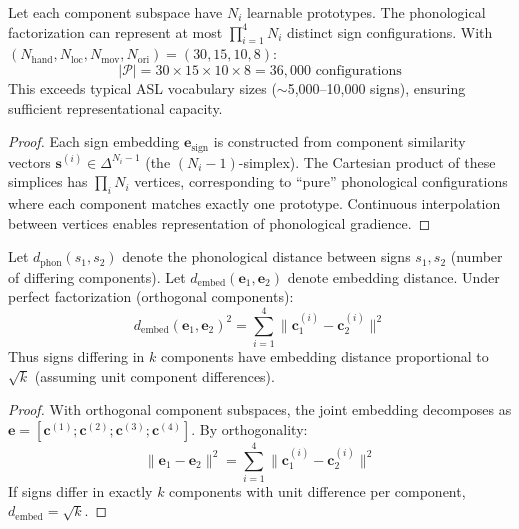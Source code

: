 \documentclass{article}
\begin{document}
\begin{proposition}
\label{prop:capacity}
Let each component subspace have $N_i$ learnable prototypes. The phonological factorization can represent at most $\prod_{i=1}^{4} N_i$ distinct sign configurations. With $(N_{\text{hand}}, N_{\text{loc}}, N_{\text{mov}}, N_{\text{ori}}) = (30, 15, 10, 8)$:
\begin{equation}
|\mathcal{P}| = 30 \times 15 \times 10 \times 8 = 36,000 \text{ configurations}
\end{equation}
This exceeds typical ASL vocabulary sizes ($\sim$5,000--10,000 signs), ensuring sufficient representational capacity.
\end{proposition}

\begin{proof}
Each sign embedding $\mathbf{e}_{\text{sign}}$ is constructed from component similarity vectors $\mathbf{s}^{(i)} \in \Delta^{N_i-1}$ (the $(N_i-1)$-simplex). The Cartesian product of these simplices has $\prod_i N_i$ vertices, corresponding to ``pure'' phonological configurations where each component matches exactly one prototype. Continuous interpolation between vertices enables representation of phonological gradience.
\end{proof}

\begin{theorem}
\label{thm:distance}
Let $d_{\text{phon}}(s_1, s_2)$ denote the phonological distance between signs $s_1, s_2$ (number of differing components). Let $d_{\text{embed}}(\mathbf{e}_1, \mathbf{e}_2)$ denote embedding distance. Under perfect factorization (orthogonal components):
\begin{equation}
d_{\text{embed}}(\mathbf{e}_1, \mathbf{e}_2)^2 = \sum_{i=1}^{4} \|\mathbf{c}_1^{(i)} - \mathbf{c}_2^{(i)}\|^2
\end{equation}
Thus signs differing in $k$ components have embedding distance proportional to $\sqrt{k}$ (assuming unit component differences).
\end{theorem}

\begin{proof}
With orthogonal component subspaces, the joint embedding decomposes as $\mathbf{e} = [\mathbf{c}^{(1)}; \mathbf{c}^{(2)}; \mathbf{c}^{(3)}; \mathbf{c}^{(4)}]$. By orthogonality:
\begin{equation}
\|\mathbf{e}_1 - \mathbf{e}_2\|^2 = \sum_{i=1}^{4} \|\mathbf{c}_1^{(i)} - \mathbf{c}_2^{(i)}\|^2
\end{equation}
If signs differ in exactly $k$ components with unit difference per component, $d_{\text{embed}} = \sqrt{k}$.
\end{proof}
\end{document}
